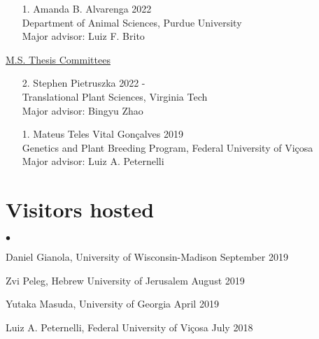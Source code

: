 \documentclass[margin,line,10pt]{res}
\newenvironment{list2}{
  \begin{list}{$\bullet$}{%
      \setlength{\itemsep}{0in}
      \setlength{\parsep}{0in} \setlength{\parskip}{0in}
      \setlength{\topsep}{0in} \setlength{\partopsep}{0in} 
      \setlength{\leftmargin}{0.2in}}}{\end{list}}
\begin{document}
\begin{resume}
\begin{enumerate}
  \vspace{0.3cm}

\item [1.] Amanda B. Alvarenga   \hfill 2022\\
  Department of Animal Sciences, Purdue University \\
  Major advisor: Luiz F. Brito
\end{enumerate}


\begin{flushleft}
\hspace{0.2cm} \underline{M.S. Thesis Committees}
\end{flushleft}

\begin{enumerate}
  \item [2.] Stephen Pietruszka \hfill 2022 - \\
  Translational Plant Sciences, Virginia Tech\\
    Major advisor: Bingyu Zhao
  \end{enumerate}

\vspace{0.3cm}

\begin{enumerate}
\item [1.] Mateus Teles Vital Gon\c calves  \hfill 2019 \\
  Genetics and Plant Breeding Program, Federal University of  Vi\c cosa\\
  Major advisor: Luiz A. Peternelli
\end{enumerate}


\vspace{0.5cm}
\section{\sc Visitors hosted}

\begin{list2}
\item Daniel Gianola, University of Wisconsin-Madison  \hfill September 2019\\

\item Zvi Peleg, Hebrew University of Jerusalem   \hfill August 2019\\

\item Yutaka Masuda, University of Georgia \hfill April 2019\\

\item Luiz A. Peternelli, Federal University of Vi\c cosa  \hfill July 2018\\


\end{list2}
\end{resume}
\end{document}
